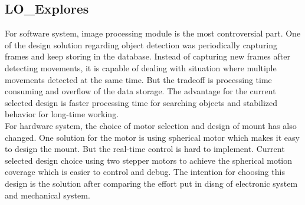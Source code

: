 \documentclass[12pt, titlepage]{article}
\begin{document}
\subsection{LO\_Explores}
\hspace*{1cm}For software system, image processing module is the most controversial part. One of the design solution regarding object detection was periodically capturing frames and keep storing in the database. Instead of capturing new frames after detecting movements, it is capable of dealing with situation where multiple movements detected at the same time. But the tradeoff is processing time consuming and overflow of the data storage. The advantage for the current selected design is faster processing time for searching objects and stabilized behavior for long-time working. 
\\\hspace*{1cm}For hardware system, the choice of motor selection and design of mount has also changed. One solution for the motor is using spherical motor which makes it easy to design the mount. But the real-time control is hard to implement. Current selected design choice using two stepper motors to achieve the spherical motion coverage which is easier to control and debug. The intention for choosing this design is the solution after comparing the effort put in disng of electronic system and mechanical system.
\end{document}

